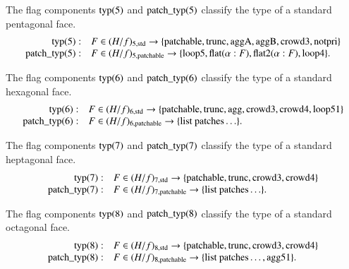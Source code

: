 \begin{definition}
The flag components ${\operatorname{typ}}(5)$ and ${\operatorname{patch\_typ}}(5)$
classify the type of a standard pentagonal face.
    $$
    \begin{array}{rll}
    {\operatorname{typ}}(5):& F\in (H/f)_{5,{\operatorname{std}}}
    \to
    \{{\operatorname{patchable}},{\operatorname{trunc}},{\operatorname{aggA}},{\operatorname{aggB}},{\operatorname{crowd3}},{\operatorname{notpri}}\}\\
    {\operatorname{patch\_typ}}(5):& F\in (H/f)_{5,{\operatorname{patchable}}}
    \to
    \{{\operatorname{loop5}},{\operatorname{flat}}(\alpha:F),{\operatorname{flat2}}(\alpha:F),{\operatorname{loop4}}\}.
    \end{array}
    $$
\end{definition}

\begin{definition}
The flag components ${\operatorname{typ}}(6)$ and ${\operatorname{patch\_typ}}(6)$
classify the type of a standard hexagonal face.
    $$
    \begin{array}{rll}
    {\operatorname{typ}}(6):& F\in (H/f)_{6,{\operatorname{std}}}
    \to
    \{{\operatorname{patchable}},{\operatorname{trunc}},{\operatorname{agg}},{\operatorname{crowd3}},{\operatorname{crowd4}},{\operatorname{loop51}}\}\\
    {\operatorname{patch\_typ}}(6):& F\in (H/f)_{6,{\operatorname{patchable}}}
    \to
    \{\text{list patches}\ldots\}.
    \end{array}
    $$
\end{definition}


\begin{definition}
The flag components ${\operatorname{typ}}(7)$ and ${\operatorname{patch\_typ}}(7)$
classify the type of a standard heptagonal face.
    $$
    \begin{array}{rll}
    {\operatorname{typ}}(7):& F\in (H/f)_{7,{\operatorname{std}}}
    \to
    \{{\operatorname{patchable}},{\operatorname{trunc}},{\operatorname{crowd3}},{\operatorname{crowd4}}\}\\
    {\operatorname{patch\_typ}}(7):& F\in (H/f)_{7,{\operatorname{patchable}}}
    \to
    \{\text{list patches}\ldots\}.
    \end{array}
    $$
\end{definition}

\begin{definition}
The flag components ${\operatorname{typ}}(8)$ and ${\operatorname{patch\_typ}}(8)$
classify the type of a standard octagonal face.
    $$
    \begin{array}{rll}
    {\operatorname{typ}}(8):& F\in (H/f)_{8,{\operatorname{std}}}
    \to
    \{{\operatorname{patchable}},{\operatorname{trunc}},{\operatorname{crowd3}},{\operatorname{crowd4}}\}\\
    {\operatorname{patch\_typ}}(8):& F\in (H/f)_{8,{\operatorname{patchable}}}
    \to
    \{\text{list patches}\ldots,{\operatorname{agg51}}\}.
    \end{array}
    $$
\end{definition}


